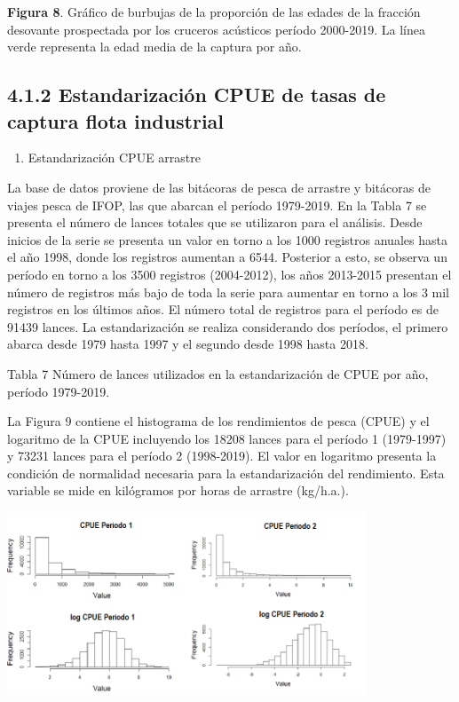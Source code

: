 \documentclass[
  spanish,
]{article}
\providecommand{\tightlist}{%
  \setlength{\itemsep}{0pt}\setlength{\parskip}{0pt}}
\begin{document}
\small \textbf{Figura 8}. Gráfico de burbujas de la proporción de las
edades de la fracción desovante prospectada por los cruceros acústicos
período 2000-2019. La línea verde representa la edad media de la captura
por año. \vspace{0.5cm} \normalsize

\hypertarget{estandarizaciuxf3n-cpue-de-tasas-de-captura-flota-industrial}{%
\subsection{4.1.2 Estandarización CPUE de tasas de captura flota
industrial}\label{estandarizaciuxf3n-cpue-de-tasas-de-captura-flota-industrial}}

\begin{enumerate}
\def\labelenumi{\alph{enumi})}
\tightlist
\item
  Estandarización CPUE arrastre
\end{enumerate}

La base de datos proviene de las bitácoras de pesca de arrastre y
bitácoras de viajes pesca de IFOP, las que abarcan el período 1979-2019.
En la Tabla 7 se presenta el número de lances totales que se utilizaron
para el análisis. Desde inicios de la serie se presenta un valor en
torno a los 1000 registros anuales hasta el año 1998, donde los
registros aumentan a 6544. Posterior a esto, se observa un período en
torno a los 3500 registros (2004-2012), los años 2013-2015 presentan el
número de registros más bajo de toda la serie para aumentar en torno a
los 3 mil registros en los últimos años. El número total de registros
para el período es de 91439 lances. La estandarización se realiza
considerando dos períodos, el primero abarca desde 1979 hasta 1997 y el
segundo desde 1998 hasta 2018.

Tabla 7 Número de lances utilizados en la estandarización de CPUE por
año, período 1979-2019.

La Figura 9 contiene el histograma de los rendimientos de pesca (CPUE) y
el logaritmo de la CPUE incluyendo los 18208 lances para el período 1
(1979-1997) y 73231 lances para el período 2 (1998-2019). El valor en
logaritmo presenta la condición de normalidad necesaria para la
estandarización del rendimiento. Esta variable se mide en kilógramos por
horas de arrastre (kg/h.a.).

\begin{center}
\includegraphics[width=0.8\textwidth]{Figuras/Figura_9.png}
\end{center}
\end{document}
